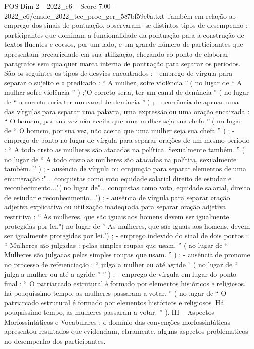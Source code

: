 \begin{textsample}{POS Dim 2 – 2022\_c6 – Score 7.00 – 2022\_c6/enade\_2022\_tec\_proc\_ger\_587bf59e0a.txt}
Também em relação ao emprego dos sinais de pontuação, observaram -se distintos tipos de desempenho : participantes que dominam a funcionalidade da pontuação para a construção de textos fluentes e coesos, por um lado, e um grande número de participantes que apresentam precariedade em sua utilização, chegando ao ponto de elaborar parágrafos sem qualquer marca interna de pontuação para separar os períodos.
São os seguintes os tipos de desvios encontrados : - emprego de vírgula para separar o sujeito e o predicado : “ A mulher, sofre violência ” ( no lugar de “ A mulher sofre violência ” ) ;"O correto seria, ter um canal de denúncia ” ( no lugar de “ o correto seria ter um canal de denúncia ” ) ; - ocorrência de apenas uma das vírgulas para separar uma palavra, uma expressão ou uma oração encaixada : “ O homem, por sua vez não aceita que uma mulher seja sua chefa ” ( no lugar de “ O homem, por sua vez, não aceita que uma mulher seja sua chefa ” ) ; - emprego de ponto no lugar de vírgula para separar orações de um mesmo período : “ A todo custo as mulheres são atacadas na política.
Sexualmente também. ” ( no lugar de “ A todo custo as mulheres são atacadas na política, sexualmente também. ” ) ; - ausência de vírgula ou conjunção para separar elementos de uma enumeração :"... conquistas como voto equidade salarial direito de estudar e reconhecimento..."( no lugar de"... conquistas como voto, equidade salarial, direito de estudar e reconhecimento...") ; - ausência de vírgula para separar oração adjetiva explicativa ou utilização inadequada para separar oração adjetiva restritiva : “ As mulheres, que são iguais aos homens devem ser igualmente protegidas por lei."( no lugar de “ As mulheres, que são iguais aos homens, devem ser igualmente protegidas por lei.") ; - emprego indevido do sinal de dois pontos : “ Mulheres são julgadas : pelas simples roupas que usam. ” ( no lugar de “ Mulheres são julgadas pelas simples roupas que usam. ” ) ; - ausência de pronome no processo de referenciação : “ julga a mulher ou até agride ” ( no lugar de “ julga a mulher ou até a agride ” ” ) ; - emprego de vírgula em lugar do ponto-final : “ O patriarcado estrutural é formado por elementos históricos e religiosos, há pouquíssimo tempo, as mulheres passaram a votar. ” ( no lugar de “ O patriarcado estrutural é formado por elementos históricos e religiosos.
Há pouquíssimo tempo, as mulheres passaram a votar. ” ).
III – Aspectos Morfossintáticos e Vocabulares : o domínio das convenções morfossintáticas apresentou resultados que evidenciam, claramente, alguns aspectos problemáticos no desempenho dos participantes.

\end{textsample}
